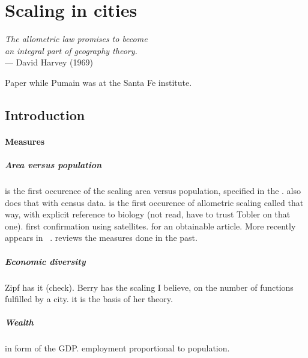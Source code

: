 %
\chapter{Scaling in cities}
\label{sec:scaling_in_cities}

\begin{flushright}{\slshape    
The allometric law promises to become\\
an integral part of geography theory.} \\ \medskip
--- David Harvey (1969)~\cite{Harvey:1969} 
\end{flushright}

\cite{Pumain:2004} Paper while Pumain was at the Santa Fe institute.

\section{Introduction}
\label{sec:introduction}

    \subsubsection{Measures}
    \label{ssub:measures}

\paragraph{Area versus population} \cite{Stewart:1947} is the first occurence of
the scaling area versus population, specified in the \cite{Stewart:1958}. \cite{Boyce:1963} also does that with census
data. \cite{Nordbeck:1965} is the first occurence
of allometric scaling called that way, with explicit reference to biology (not
read, have to trust Tobler on that one).
\cite{Tobler:1969} first confirmation using satellites. \cite{Nordbeck:1971} for
an obtainable article. More recently appears in ~\cite{Guerois:2003}.
\cite{Batty:2011} reviews the measures done in the past.

\paragraph{Economic diversity} \cite{Zipf:1949} Zipf has it (check). \cite{Berry:1967} Berry has the scaling I
believe, on the number of functions fulfilled by a city. \cite{Pumain:2006} it
is the basis of her theory. \cite{Bettencourt:2014}

\paragraph{Wealth} \cite{Bettencourt:2007} in form of the GDP.
\cite{Bettencourt:2014} employment proportional to population.

